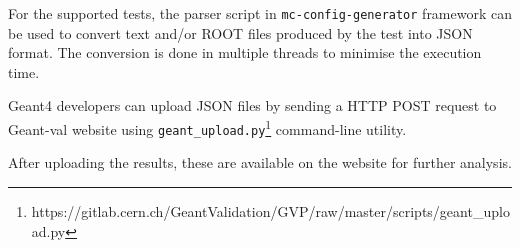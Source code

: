 For the supported tests, the parser script in {\tt mc-config-generator} framework can be used to convert text and/or ROOT files produced by the test into JSON format. The conversion is done in multiple threads to minimise the execution time.

Geant4 developers can upload JSON files by sending a HTTP POST request to \textsf{Geant-val} website using {\tt geant\_upload.py}\footnote{https://gitlab.cern.ch/GeantValidation/GVP/raw/master/scripts/geant\_upload.py} command-line utility.

After uploading the results, these are available on the website for further analysis.

